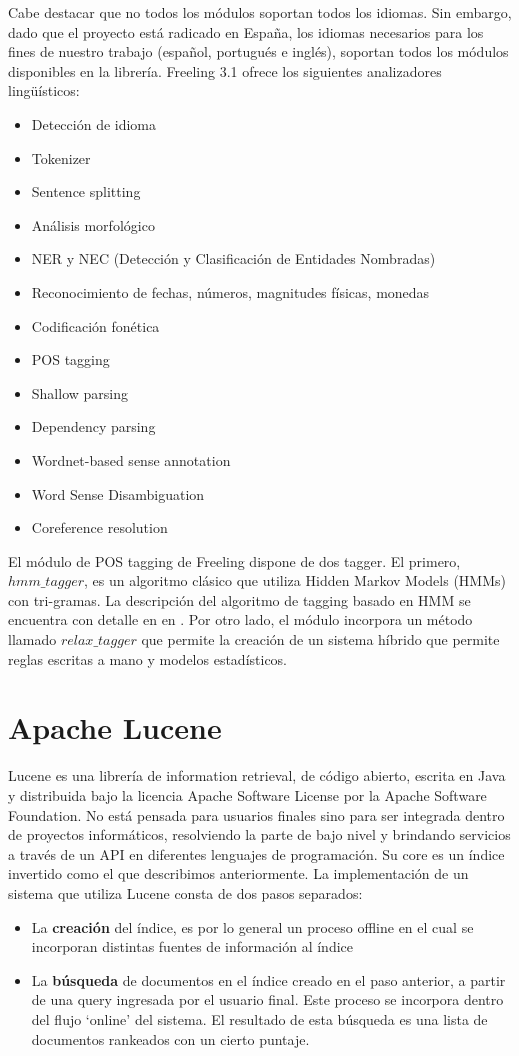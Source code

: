 Cabe destacar que no todos los m\'odulos soportan todos los idiomas. Sin embargo, dado que el proyecto está radicado en Espa\~na,
los idiomas necesarios para los fines de nuestro trabajo (espa\~nol, portugués e inglés), soportan todos los m\'odulos disponibles
en la librería.
Freeling 3.1 ofrece los siguientes analizadores lingüísticos:

\begin{itemize}
\item Detecci\'on de idioma
\item Tokenizer
\item Sentence splitting
\item Análisis morfol\'ogico
\item NER y NEC (Detecci\'on y Clasificaci\'on de Entidades Nombradas)
\item Reconocimiento de fechas, números, magnitudes físicas, monedas
\item Codificaci\'on fonética
\item POS tagging
\item Shallow parsing
\item Dependency parsing
\item Wordnet-based sense annotation
\item Word Sense Disambiguation
\item Coreference resolution
\end{itemize}


El módulo de POS tagging de Freeling dispone de dos tagger. El primero, $hmm\_tagger$, es un algoritmo clásico que utiliza Hidden Markov Models (HMMs) con tri-gramas. La descripción del algoritmo de tagging basado en HMM se encuentra con detalle en  en \cite{POS0}. Por otro lado, el módulo incorpora un método llamado $relax\_tagger$ que permite la creación de un sistema híbrido que permite reglas escritas a mano y modelos estadísticos.

\section{Apache Lucene}
\label{sec:lucene}
Lucene es una librería de information retrieval, de c\'odigo abierto, escrita en Java y distribuida
bajo la licencia Apache Software License por la Apache Software Foundation. No está pensada para
usuarios finales sino para ser integrada dentro de proyectos informáticos, resolviendo
la parte de bajo nivel y brindando servicios a través de un API en diferentes lenguajes de programaci\'on.
Su core es un índice invertido como el que describimos anteriormente. La implementaci\'on de un sistema
que utiliza Lucene consta de dos pasos separados:
\begin{itemize}
\item La \textbf{creaci\'on} del índice, es por lo general un proceso offline en el cual
se incorporan distintas fuentes de informaci\'on al índice
\item La \textbf{búsqueda} de documentos en el índice creado en el paso anterior, a partir de una query
ingresada por el usuario final. Este proceso se incorpora dentro del flujo `online' del sistema.
El resultado de esta búsqueda es una lista de documentos rankeados con un cierto puntaje.
\end{itemize}

